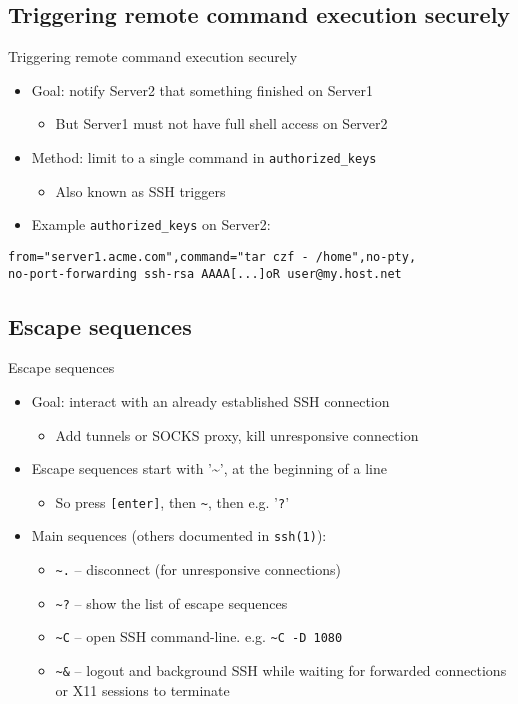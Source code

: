 \documentclass[11pt,final,usepdftitle=false]{beamer}
\newcommand{\tilda}{\textasciitilde{}}
\begin{document}
\subsection{Triggering remote command execution securely}
\begin{frame}[fragile]{Triggering remote command execution securely}
\begin{itemize}
\item Goal: notify Server2 that something finished on Server1
	\begin{itemize}
		\item But Server1 must not have full shell access on Server2
	\end{itemize}
	\hbr
\item Method: limit to a single command in \texttt{authorized\_keys}
	\begin{itemize}
		\item Also known as SSH triggers
	\end{itemize}
\hbr
\item Example \texttt{authorized\_keys} on Server2:
\end{itemize}
\begin{lstlisting}[basicstyle=\ttfamily\small,escapeinside={||}]
from="server1.acme.com",command="tar czf - /home",no-pty,
no-port-forwarding ssh-rsa AAAA[...]oR user@my.host.net
\end{lstlisting}
\end{frame}

\subsection{Escape sequences}
\begin{frame}[fragile]{Escape sequences}
\begin{itemize}
\item Goal: interact with an already established SSH connection
	\begin{itemize}
		\item Add tunnels or SOCKS proxy, kill unresponsive connection
	\end{itemize}
\hbr
\item Escape sequences start with '\tilda', at the beginning of a line
	\begin{itemize}
		\item So press \texttt{[enter]}, then \texttt{\tilda}, then e.g. '\texttt{?}'
	\end{itemize}
\hbr
\item Main sequences (others documented in \texttt{ssh(1)}):
	\begin{itemize}
		\item \texttt{\tilda{}.} -- disconnect (for unresponsive connections)
		\item \texttt{\tilda{}?} -- show the list of escape sequences
		\item \texttt{\tilda{}C} -- open SSH command-line. e.g. \texttt{\tilda{}C -D 1080}
		\item \texttt{\tilda{}\&} -- logout and background SSH while waiting for forwarded connections or X11 sessions to terminate
	\end{itemize}
\end{itemize}
\end{frame}
\end{document}
